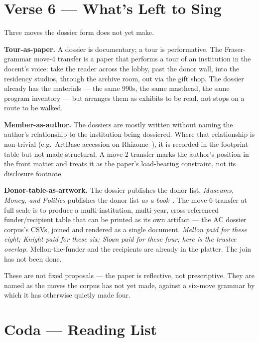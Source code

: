 \documentclass[10pt,letterpaper,twocolumn]{article}
\begin{document}
\section{Verse 6 --- What's Left to Sing}

Three moves the dossier form does not yet make.

\textbf{Tour-as-paper.} A dossier is documentary; a tour is performative. The Fraser-grammar move-4 transfer is a paper that performs a tour of an institution in the docent's voice: take the reader across the lobby, past the donor wall, into the residency studios, through the archive room, out via the gift shop. The dossier already has the materials --- the same 990s, the same masthead, the same program inventory --- but arranges them as exhibits to be read, not stops on a route to be walked.

\textbf{Member-as-author.} The dossiers are mostly written without naming the author's relationship to the institution being dossiered. Where that relationship is non-trivial (e.g.\ ArtBase accession on Rhizome~\citep{ac2026rhizome}), it is recorded in the footprint table but not made structural. A move-2 transfer marks the author's position in the front matter and treats it as the paper's load-bearing constraint, not its disclosure footnote.

\textbf{Donor-table-as-artwork.} The dossier publishes the donor list. \emph{Museums, Money, and Politics} publishes the donor list \emph{as a book}~\citep{fraser2018museums}. The move-6 transfer at full scale is to produce a multi-institution, multi-year, cross-referenced funder/recipient table that can be printed as its own artifact --- the AC dossier corpus's CSVs, joined and rendered as a single document. \emph{Mellon paid for these eight; Knight paid for these six; Sloan paid for these four; here is the trustee overlap.} Mellon-the-funder and the recipients are already in the platter. The join has not been done.

These are not fixed proposals --- the paper is reflective, not prescriptive. They are named as the moves the corpus has not yet made, against a six-move grammar by which it has otherwise quietly made four.

\section{Coda --- Reading List}
\end{document}

